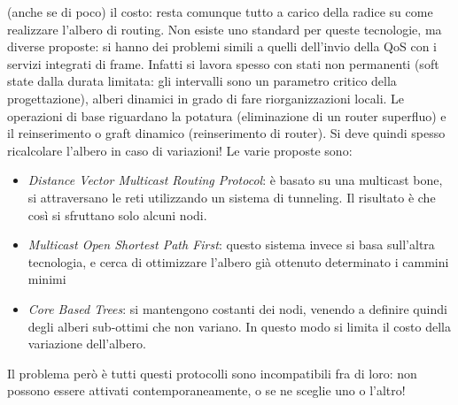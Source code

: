 (anche se di poco) il costo: resta comunque tutto a carico della radice su come realizzare l'albero di routing.
Non esiste uno standard per queste tecnologie, ma diverse proposte: si hanno dei problemi simili a quelli dell'invio
della QoS con i servizi integrati di frame.
Infatti si lavora spesso con stati non permanenti (soft state dalla durata limitata: gli intervalli sono un parametro
critico della progettazione), alberi dinamici in grado di fare riorganizzazioni locali. Le operazioni di base riguardano
la potatura (eliminazione di un router superfluo) e il reinserimento o graft dinamico (reinserimento di router). Si deve
quindi spesso ricalcolare l'albero in caso di variazioni! Le varie proposte sono:
\begin{itemize}
 \item \textit{Distance Vector Multicast Routing Protocol}: è basato su una multicast bone, si attraversano le reti
 utilizzando un sistema di tunneling. Il risultato è che così si sfruttano solo alcuni nodi.
 \item \textit{Multicast Open Shortest Path First}: questo sistema invece si basa sull'altra tecnologia, e cerca di
 ottimizzare l'albero già ottenuto determinato i cammini minimi
 \item \textit{Core Based Trees}: si mantengono costanti dei nodi, venendo a definire quindi degli alberi sub-ottimi
 che non variano. In questo modo si limita il costo della variazione dell'albero.
\end{itemize}
Il problema però è tutti questi protocolli sono incompatibili fra di loro: non possono essere attivati
contemporaneamente, o se ne sceglie uno o l'altro!
